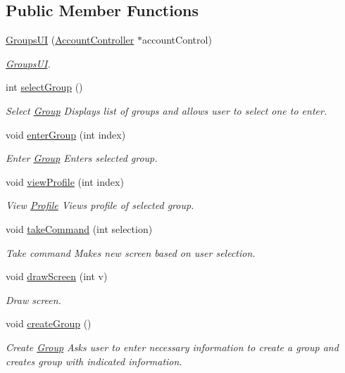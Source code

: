 \subsection*{Public Member Functions}
\begin{DoxyCompactItemize}
\item 
\hyperlink{classGroupsUI_a874193355176aa40b6fce30e8aeb708f}{Groups\+UI} (\hyperlink{classAccountController}{Account\+Controller} $\ast$account\+Control)
\begin{DoxyCompactList}\small\item\em \hyperlink{classGroupsUI}{Groups\+UI}. \end{DoxyCompactList}\item 
int \hyperlink{classGroupsUI_a2d1126b3e3cd8ecba3c0e1bebc521736}{select\+Group} ()\hypertarget{classGroupsUI_a2d1126b3e3cd8ecba3c0e1bebc521736}{}\label{classGroupsUI_a2d1126b3e3cd8ecba3c0e1bebc521736}

\begin{DoxyCompactList}\small\item\em Select \hyperlink{classGroup}{Group} Displays list of groups and allows user to select one to enter. \end{DoxyCompactList}\item 
void \hyperlink{classGroupsUI_ac2513b740609c8263db85b91cf69ac2b}{enter\+Group} (int index)
\begin{DoxyCompactList}\small\item\em Enter \hyperlink{classGroup}{Group} Enters selected group. \end{DoxyCompactList}\item 
void \hyperlink{classGroupsUI_a77de7dab3346d7e57fb389f396cb24a6}{view\+Profile} (int index)
\begin{DoxyCompactList}\small\item\em View \hyperlink{classProfile}{Profile} Views profile of selected group. \end{DoxyCompactList}\item 
void \hyperlink{classGroupsUI_a64cf522aeb035d00db3bbd8da38875bb}{take\+Command} (int selection)
\begin{DoxyCompactList}\small\item\em Take command Makes new screen based on user selection. \end{DoxyCompactList}\item 
void \hyperlink{classGroupsUI_ab3edbe00293aeda49e5251d2777984bf}{draw\+Screen} (int v)
\begin{DoxyCompactList}\small\item\em Draw screen. \end{DoxyCompactList}\item 
void \hyperlink{classGroupsUI_a4ce092af55dae46d5c270d5f32a69784}{create\+Group} ()\hypertarget{classGroupsUI_a4ce092af55dae46d5c270d5f32a69784}{}\label{classGroupsUI_a4ce092af55dae46d5c270d5f32a69784}

\begin{DoxyCompactList}\small\item\em Create \hyperlink{classGroup}{Group} Asks user to enter necessary information to create a group and creates group with indicated information. \end{DoxyCompactList}\end{DoxyCompactItemize}
